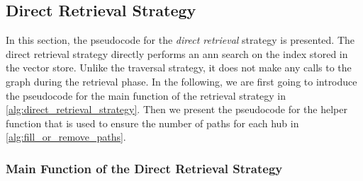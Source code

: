 \subsection{Direct Retrieval Strategy} 

In this section, the pseudocode for the \emph{direct retrieval} strategy is presented. The direct retrieval strategy directly performs an \gls{ann} search on the index stored in the vector store. Unlike the traversal strategy, it does not make any calls to the graph during the retrieval phase. In the following, we are first going to introduce the pseudocode for the main function of the retrieval strategy in \autoref{alg:direct_retrieval_strategy}. Then we present the pseudocode for the helper function that is used to ensure the number of paths for each hub in \autoref{alg:fill_or_remove_paths}.

\subsubsection{Main Function of the Direct Retrieval Strategy}

